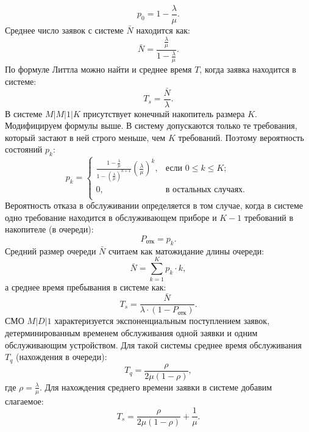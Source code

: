 \documentclass[a4paper,12 pt]{article}
\begin{document}
\begin{equation*}
p_0 = 1 - \frac{\lambda}{\mu}.
\end{equation*}
Среднее число заявок с системе $\bar{N}$ находится как:
\begin{equation*}
	\bar{N} = \frac{\frac{\lambda}{\mu}}{1-\frac{\lambda}{\mu}}.
\end{equation*}
По формуле Литтла можно найти и среднее время $T$, когда заявка находится в системе:
\begin{equation*}
T_s = \frac{\bar{N}}{\lambda}.
\end{equation*}
В системе $M|M|1|K$ присутствует конечный накопитель размера $K$. Модифицируем формулы выше. В систему допускаются только те требования, который застают в ней строго меньше, чем $K$ требований. Поэтому вероятность состояний $p_k$:
\begin{equation}
p_k = 	\begin{cases} \frac{1 - \frac{\lambda}{\mu}}{1-(\frac{\lambda}{\mu})^{k + 1}}(\frac{\lambda}{\mu})^k,  & \text{если } 0 \le k \le K; \\
0, & \text{в остальных случаях. } \\
	\end{cases}
\end{equation}
Вероятность  отказа в обслуживании определяется в том случае, когда в системе одно требование находится в обслуживающем приборе и $K-1$ требований в накопителе (в очереди):
\begin{equation}
	P_{\text{отк}} = p_k.
\end{equation}
Средний размер очереди $\bar{N}$ считаем как матожидание длины очереди:
\begin{equation}
	\bar{N} = \sum^{K}_{k = 1}p_k \cdot k,
\end{equation} 
а среднее время пребывания в системе как:
\begin{equation}
	T_s = \frac{\bar{N}}{\lambda \cdot (1 - P_{\text{отк}})}.
\end{equation}
СМО $M|D|1$ характеризуется экспоненциальным поступлением заявок, детерминированным временем обслуживания одной заявки и одним обслуживающим устройством. Для такой системы среднее время обслуживания $T_q$ (нахождения в очереди):
\begin{equation}
	T_q = \dfrac{\rho}{2\mu(1-\rho)},
\end{equation}
где $\rho = \frac{\lambda}{\mu}$. Для нахождения среднего времени заявки в системе добавим слагаемое:
\begin{equation}
T_s = \dfrac{\rho}{2\mu(1-\rho)} + \frac{1}{\mu}.
\end{equation}
\end{document}
